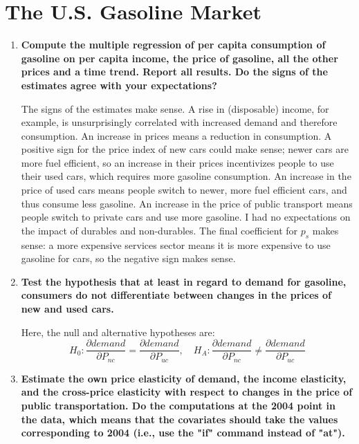 \documentclass{article}
\begin{document}
\newpage
\section{The U.S. Gasoline Market}

\begin{enumerate}[label=\alph*.]
\item \textbf{Compute the multiple regression of per capita consumption of gasoline on per capita income, the price of gasoline, all the other prices and a time trend. Report all results. Do the signs of the estimates agree with your expectations?}


The signs of the estimates make sense. A rise in (disposable) income, for example, is unsurprisingly correlated with increased demand and therefore consumption. An increase in prices means a reduction in consumption. A positive sign for the price index of new cars could make sense; newer cars are more fuel efficient, so an increase in their prices incentivizes people to use their used cars, which requires more gasoline consumption. An increase in the price of used cars means people switch to newer, more fuel efficient cars, and thus consume less gasoline. An increase in the price of public transport means people switch to private cars and use more gasoline. I had no expectations on the impact of durables and non-durables. The final coefficient for $p_s$ makes sense: a more expensive services sector means it is more expensive to use gasoline for cars, so the negative sign makes sense. 
\item \textbf{Test the hypothesis that at least in regard to demand for gasoline, consumers do not differentiate between changes in the prices of new and used cars.}

Here, the null and alternative hypotheses are:
$$ H_0:\frac{\partial demand}{\partial P_{nc}}=\frac{\partial demand}{\partial P_{uc}}, \quad H_A: \frac{\partial demand}{\partial P_{nc}} \neq \frac{\partial demand}{\partial P_{uc}}$$

\item \textbf{Estimate the own price elasticity of demand, the income elasticity, and the cross-price elasticity with respect to changes in the price of public transportation. Do the computations at the 2004 point in the data, which means that the covariates should take the values corresponding to 2004 (i.e., use the "if" command instead of "at").}\\


\end{enumerate}
\end{document}
